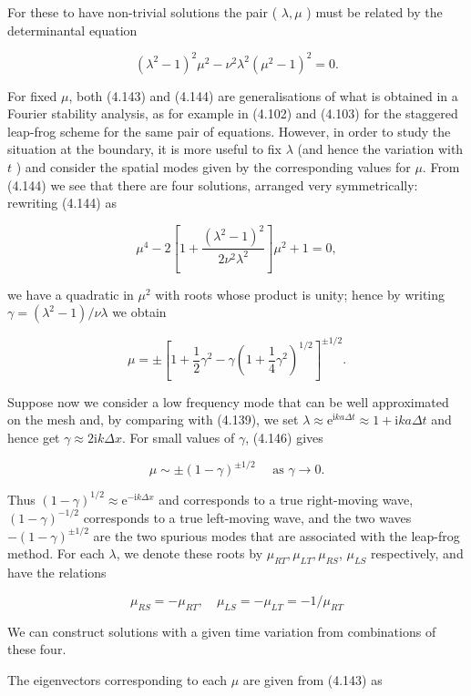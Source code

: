 \documentclass[10pt]{article}
\begin{document}
For these to have non-trivial solutions the pair ( \(\lambda, \mu\) ) must be related by the determinantal equation

\[
\left(\lambda^{2}-1\right)^{2} \mu^{2}-\nu^{2} \lambda^{2}\left(\mu^{2}-1\right)^{2}=0 .
\]

For fixed \(\mu\), both (4.143) and (4.144) are generalisations of what is obtained in a Fourier stability analysis, as for example in (4.102) and (4.103) for the staggered leap-frog scheme for the same pair of equations. However, in order to study the situation at the boundary, it is more useful to fix \(\lambda\) (and hence the variation with \(t\) ) and consider the spatial modes given by the corresponding values for \(\mu\). From (4.144) we see that there are four solutions, arranged very symmetrically: rewriting (4.144) as

\[
\mu^{4}-2\left[1+\frac{\left(\lambda^{2}-1\right)^{2}}{2 \nu^{2} \lambda^{2}}\right] \mu^{2}+1=0,
\]

we have a quadratic in \(\mu^{2}\) with roots whose product is unity; hence by writing \(\gamma=\left(\lambda^{2}-1\right) / \nu \lambda\) we obtain

\[
\mu= \pm\left[1+\frac{1}{2} \gamma^{2}-\gamma\left(1+\frac{1}{4} \gamma^{2}\right)^{1 / 2}\right]^{ \pm 1 / 2} .
\]

Suppose now we consider a low frequency mode that can be well approximated on the mesh and, by comparing with (4.139), we set \(\lambda \approx \mathrm{e}^{\mathrm{i} k a \Delta t} \approx 1+\mathrm{i} k a \Delta t\) and hence get \(\gamma \approx 2 \mathrm{i} k \Delta x\). For small values of \(\gamma\), (4.146) gives

\[
\mu \sim \pm(1-\gamma)^{ \pm 1 / 2} \quad \text { as } \gamma \rightarrow 0 .
\]

Thus \((1-\gamma)^{1 / 2} \approx \mathrm{e}^{-\mathrm{i} k \Delta x}\) and corresponds to a true right-moving wave, \((1-\gamma)^{-1 / 2}\) corresponds to a true left-moving wave, and the two waves \(-(1-\gamma)^{ \pm 1 / 2}\) are the two spurious modes that are associated with the leap-frog method. For each \(\lambda\), we denote these roots by \(\mu_{R T}, \mu_{L T}, \mu_{R S}\), \(\mu_{L S}\) respectively, and have the relations

\[
\mu_{R S}=-\mu_{R T}, \quad \mu_{L S}=-\mu_{L T}=-1 / \mu_{R T}
\]

We can construct solutions with a given time variation from combinations of these four.

The eigenvectors corresponding to each \(\mu\) are given from (4.143) as
\end{document}
